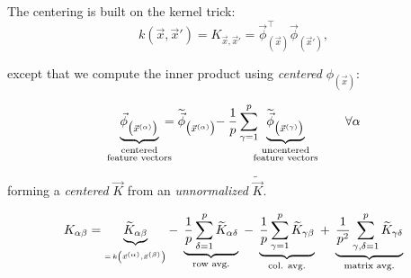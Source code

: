 \begin{frame}{\subsecname}



The centering is built on the kernel trick:
\begin{equation}
      k(\vec{x}, \vec{x}') = K_{\vec x,\vec x'} = \vec{\phi}_{(\vec{x})}^\top 
		\vec{\phi}_{(\vec{x}')},
\end{equation}

except that we compute the inner product using \emph{centered} $\phi_{(\vec x)}$:

\begin{equation}
	\underbrace{ \vec{\phi}_{\big( \vec{x}^{(\alpha)} \big)} }_{
		\substack{ 	\text{centered} \\
				\text{feature vectors}} }
				\hspace{-3mm}
	= \widetilde{\vec{\phi}}_{\big( \vec{x}^{(\alpha)} \big)}
				\hspace{-1mm}
		- \frac{1}{p} \sum\limits_{\gamma = 1}^p 
				\hspace{-2mm}
		\underbrace{ \widetilde{\vec{\phi}}_{\big( \vec{x}^{(\gamma)} 
				\big)} }_{
			\substack{ 	\text{uncentered} \\
					\text{feature vectors}} }
					\qquad \forall \alpha
\end{equation}

forming a \emph{centered} $\vec K$ from an \emph{unnormalized} $\widetilde{\vec K}$.

\begin{equation}
	K_{\alpha \beta} = \underbrace{\widetilde{K}_{\alpha \beta}}_{ _{= \, k \left ( \vec{x}^{(\alpha)},
			\vec{x}^{(\beta)} \right )}}
		- \;\underbrace{\frac{1}{p} \sum\limits_{\delta = 1}^p 
		\widetilde{K}_{\alpha \delta}}_\text{\scriptsize{row avg.}} 
		\; - \; \underbrace{\frac{1}{p} 
		\sum\limits_{\gamma = 1}^p 
		\widetilde{K}_{\gamma \beta}}_\text{\scriptsize{col. avg.}}
		\;+ \;\underbrace{\frac{1}{p^2} 
		\sum\limits_{\gamma, \delta = 1}^p 
		\widetilde{K}_{\gamma \delta}}_\text{\scriptsize{matrix avg.}}
\end{equation}%


\end{frame}

